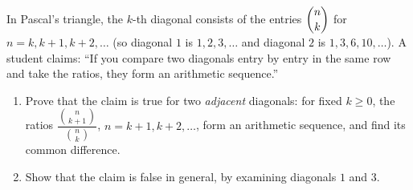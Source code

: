 In Pascal's triangle, the $k$-th diagonal consists of the entries $\dbinom nk$ for $n=k,k+1,k+2,\dots$ (so diagonal $1$ is $1,2,3,\dots$ and diagonal $2$ is $1,3,6,10,\dots$). A student claims: ``If you compare two diagonals entry by entry in the same row and take the ratios, they form an arithmetic sequence.''
\begin{enumerate}
\item[(a)] Prove that the claim is true for two \emph{adjacent} diagonals: for fixed $k\ge0$, the ratios $\dfrac{\binom n{k+1}}{\binom nk}$, $n=k+1,k+2,\dots$, form an arithmetic sequence, and find its common difference.
\item[(b)] Show that the claim is false in general, by examining diagonals $1$ and $3$.
\end{enumerate}
